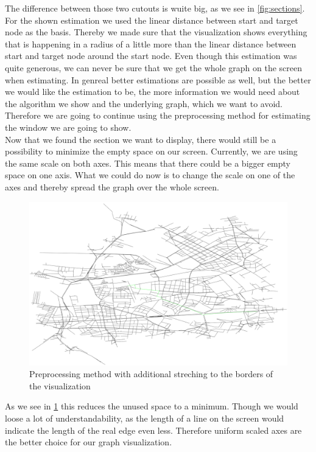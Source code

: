 \documentclass
[
	paper = a4,
    pagesize,
	12 pt,
	oneside,                       %
    open = right,
	DIV = calc,
	BCOR = 0 mm,                   %
	bibtotoc
]
{scrbook}
\begin{document}
The difference between those two cutouts is wuite big, as we see in \cref{fig:sections}.
For the shown estimation we used the linear distance between start and target node as the basis.
Thereby we made sure that the visualization shows everything that is happening in a radius of a little more than the linear distance between start and target node around the start node.
Even though this estimation was quite generous, we can never be sure that we get the whole graph on the screen when estimating.
In genreal better estimations are possible as well, but the better we would like the estimation to be, the more information we would need about the algorithm we show and the underlying graph, which we want to avoid.
Therefore we are going to continue using the preprocessing method for estimating the window we are going to show.\\

Now that we found the section we want to display, there would still be a possibility to minimize the empty space on our screen.
Currently, we are using the same scale on both axes.
This means that there could be a bigger empty space on one axis.
What we could do now is to change the scale on one of the axes and thereby spread the graph over the whole screen.

\begin{figure}[H]
    \includegraphics[width=\textwidth]{Images/vis-preprocessing-streched.png}
\caption[]{Preprocessing method with additional streching to the borders of the visualization}
\label{fig:spreaded_axis}
\end{figure}

As we see in \cref{fig:spreaded_axis} this reduces the unused space to a minimum.
Though we would loose a lot of understandability, as the length of a line on the screen would indicate the length of the real edge even less.
Therefore uniform scaled axes are the better choice for our graph visualization.
\end{document}
